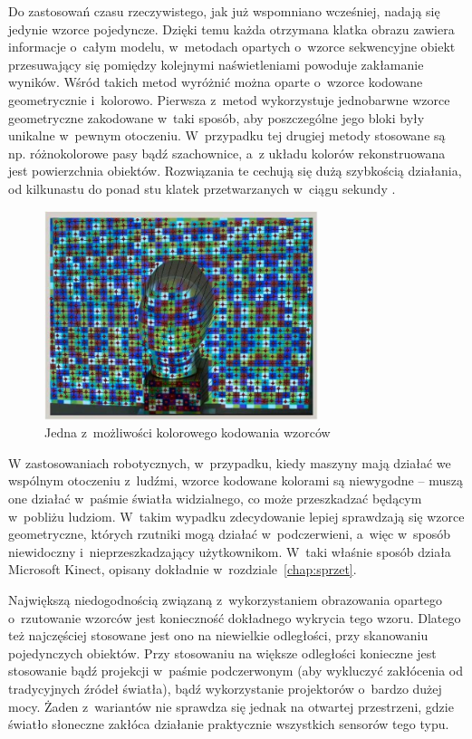Do zastosowań czasu rzeczywistego, jak już wspomniano wcześniej, nadają się
jedynie wzorce pojedyncze. Dzięki temu każda otrzymana klatka obrazu zawiera
informacje o~całym modelu, w~metodach opartych o~wzorce sekwencyjne obiekt
przesuwający się pomiędzy kolejnymi naświetleniami powoduje zakłamanie wyników.
Wśród takich metod wyróżnić można oparte o~wzorce kodowane geometrycznie 
i~kolorowo. Pierwsza z~metod wykorzystuje jednobarwne wzorce geometryczne
zakodowane w~taki sposób, aby poszczególne jego bloki były unikalne w~pewnym
otoczeniu. W~przypadku tej drugiej metody stosowane są np. różnokolorowe pasy
bądź szachownice, a~z układu kolorów rekonstruowana jest powierzchnia obiektów.
Rozwiązania te cechują się dużą szybkością działania, od kilkunastu do ponad
stu klatek przetwarzanych w~ciągu sekundy \cite{4429304}.

\begin{figure}[h!]
\centering
\includegraphics[width=8cm]{../../Common/img/struct_color}
\caption[Wzorzec kodowany kolorem]
{Jedna z~możliwości kolorowego kodowania wzorców \cite{4429304}}
\label{fig:struct_color}
\end{figure}

W zastosowaniach robotycznych, w~przypadku, kiedy maszyny mają działać we
wspólnym otoczeniu z~ludźmi, wzorce kodowane kolorami są niewygodne -- muszą one
działać w~paśmie światła widzialnego, co może przeszkadzać będącym w~pobliżu
ludziom. W~takim wypadku zdecydowanie lepiej sprawdzają się wzorce
geometryczne, których rzutniki mogą działać w~podczerwieni, a~więc w~sposób
niewidoczny i~nieprzeszkadzający użytkownikom. W~taki właśnie sposób działa
Microsoft Kinect, opisany dokładnie w~rozdziale~\ref{chap:sprzet}.

Największą niedogodnością związaną z~wykorzystaniem obrazowania opartego 
o~rzutowanie wzorców jest konieczność dokładnego wykrycia tego wzoru. Dlatego też
najczęściej stosowane jest ono na niewielkie odległości, przy skanowaniu
pojedynczych obiektów. Przy stosowaniu na większe odległości konieczne jest
stosowanie bądź projekcji w~paśmie podczerwonym (aby wykluczyć zakłócenia od
tradycyjnych źródeł światła), bądź wykorzystanie projektorów o~bardzo dużej
mocy. Żaden z~wariantów nie sprawdza się jednak na otwartej przestrzeni, gdzie
światło słoneczne zakłóca działanie praktycznie wszystkich sensorów tego typu.


